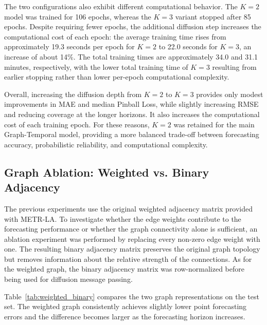 The two configurations also exhibit different computational behavior. The
$K=2$ model was trained for 106 epochs, whereas the $K=3$ variant stopped
after 85 epochs. Despite requiring fewer epochs, the additional diffusion
step increases the computational cost of each epoch: the average training
time rises from approximately 19.3 seconds per epoch for $K=2$ to 22.0
seconds for $K=3$, an increase of about 14\%. The total training times are
approximately 34.0 and 31.1 minutes, respectively, with the lower total
training time of $K=3$ resulting from earlier stopping rather than lower
per-epoch computational complexity.

Overall, increasing the diffusion depth from $K=2$ to $K=3$ provides only
modest improvements in MAE and median Pinball Loss, while slightly increasing
RMSE and reducing coverage at the longer horizons. It also increases the
computational cost of each training epoch. For these reasons, $K=2$ was
retained for the main Graph-Temporal model, providing a more balanced
trade-off between forecasting accuracy, probabilistic reliability, and
computational complexity.

\subsection{Graph Ablation: Weighted vs. Binary Adjacency}
\label{subsec:weighted_binary}

The previous experiments use the original weighted adjacency matrix provided
with METR-LA. To investigate whether the edge weights contribute to the
forecasting performance or whether the graph connectivity alone is sufficient,
an ablation experiment was performed by replacing every non-zero edge weight
with one. The resulting binary adjacency matrix preserves the original graph
topology but removes information about the relative strength of the
connections. As for the weighted graph, the binary adjacency matrix was
row-normalized before being used for diffusion message passing.

Table~\ref{tab:weighted_binary} compares the two graph representations on the
test set. The weighted graph consistently achieves slightly lower point forecasting
errors and the difference becomes larger as the forecasting horizon increases.


